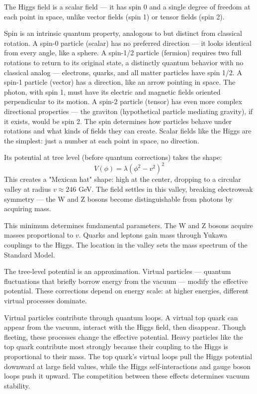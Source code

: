 The Higgs field is a scalar field — it has spin 0 and a single degree of freedom at each point in space, unlike vector fields (spin 1) or tensor fields (spin 2).

Spin is an intrinsic quantum property, analogous to but distinct from classical rotation. A spin-0 particle (scalar) has no preferred direction — it looks identical from every angle, like a sphere. A spin-1/2 particle (fermion) requires two full rotations to return to its original state, a distinctly quantum behavior with no classical analog — electrons, quarks, and all matter particles have spin 1/2. A spin-1 particle (vector) has a direction, like an arrow pointing in space. The photon, with spin 1, must have its electric and magnetic fields oriented perpendicular to its motion. A spin-2 particle (tensor) has even more complex directional properties — the graviton (hypothetical particle mediating gravity), if it exists, would be spin 2. The spin determines how particles behave under rotations and what kinds of fields they can create. Scalar fields like the Higgs are the simplest: just a number at each point in space, no direction.

Its potential at tree level (before quantum corrections) takes the shape:
\[
V(\phi) = \lambda(\phi^2 - v^2)^2
\]
This creates a "Mexican hat" shape: high at the center, dropping to a circular valley at radius $v \approx 246$ GeV. The field settles in this valley, breaking electroweak symmetry — the W and Z bosons become distinguishable from photons by acquiring mass.

This minimum determines fundamental parameters. The W and Z bosons acquire masses proportional to $v$. Quarks and leptons gain mass through Yukawa couplings to the Higgs. The location in the valley sets the mass spectrum of the Standard Model.

The tree-level potential is an approximation. Virtual particles — quantum fluctuations that briefly borrow energy from the vacuum — modify the effective potential. These corrections depend on energy scale: at higher energies, different virtual processes dominate.

Virtual particles contribute through quantum loops. A virtual top quark can appear from the vacuum, interact with the Higgs field, then disappear. Though fleeting, these processes change the effective potential. Heavy particles like the top quark contribute most strongly because their coupling to the Higgs is proportional to their mass. The top quark's virtual loops pull the Higgs potential downward at large field values, while the Higgs self-interactions and gauge boson loops push it upward. The competition between these effects determines vacuum stability.

